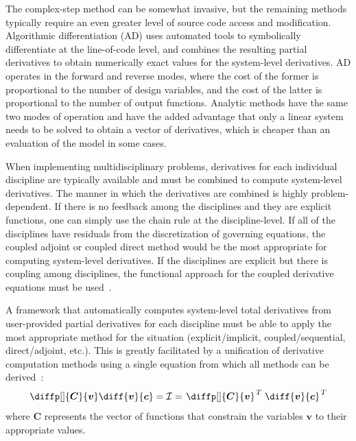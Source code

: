 \documentclass[]{aiaa-tc} %
\begin{document}
    The complex-step method can be somewhat invasive, but the remaining methods typically require an even greater level of source code access and modification.
    Algorithmic differentiation (AD) uses automated tools to symbolically differentiate at the line-of-code level, and combines the resulting partial derivatives to obtain numerically exact values for the system-level derivatives.
    AD operates in the forward and reverse modes, where the cost of the former is proportional to the number of design variables, and the cost of the latter is proportional to the number of output functions.
    Analytic methods have the same two modes of operation and have the added advantage that only a linear system needs to be solved to obtain a vector of derivatives, which is cheaper than an evaluation of the model in some cases.

    When implementing multidisciplinary problems, derivatives for each individual discipline
    are typically available and must be combined to compute system-level derivatives.
    The manner in which the derivatives are combined is highly problem-dependent.
    If there is no feedback among the disciplines and they are explicit functions, one can simply
    use the chain rule at the discipline-level. If all of the disciplines have residuals from the
    discretization of governing equations, the coupled adjoint or coupled direct method would be
    the most appropriate for computing system-level derivatives. If the disciplines are explicit
    but there is coupling among disciplines, the functional approach for the coupled derivative equations must be used~\cite{Sobieski1990,martins2013}.

    A framework that automatically computes system-level total derivatives from user-provided
    partial derivatives for each discipline must be able to apply the most appropriate method
    for the situation (explicit/implicit, coupled/sequential, direct/adjoint, etc.). This is greatly facilitated by a
    unification of derivative computation methods using a single equation from which all
    methods can be derived~\cite{martins2013}:
    \begin{equation}
        \diffp[]{\bm C}{\bm v} \diff{\bm v}{\bm c} = \mathcal{\bm I} = \left. \diffp[]{\bm C}{\bm v} \right.^T \left. \diff{\bm v}{\bm c} \right.^T
    \end{equation}
    where $\bm C$ represents the vector of functions that constrain the variables $\bm v$ to their appropriate values.
\end{document}

